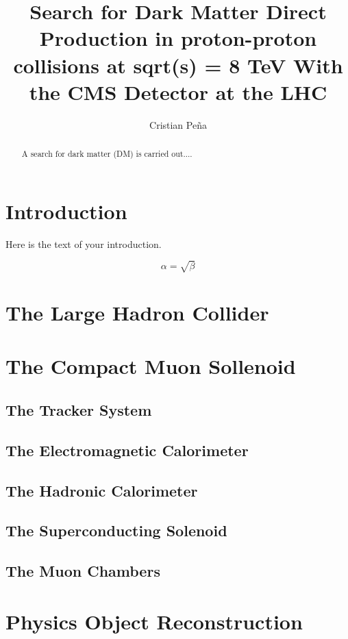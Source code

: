 \documentclass[draftfoot,preprint]{cit_thesis}
\begin{document}
\title{Search for Dark Matter Direct Production in proton-proton collisions at sqrt(s) = 8 TeV With the CMS Detector at the LHC}
\author{Cristian Pe\~na}

\maketitle

\begin{abstract}
A search for dark matter (DM) is carried out....
\end{abstract}

\section{Introduction}
Here is the text of your introduction.

\begin{equation}
    \label{simple_equation}
    \alpha = \sqrt{ \beta }
\end{equation}

\section{The Large Hadron Collider}
\section{The Compact Muon Sollenoid}
\subsection{The Tracker System}
\subsection{The Electromagnetic Calorimeter}
\subsection{The Hadronic Calorimeter}
\subsection{The Superconducting Solenoid}
\subsection{The Muon Chambers}
\section{Physics Object Reconstruction}
\end{document}

